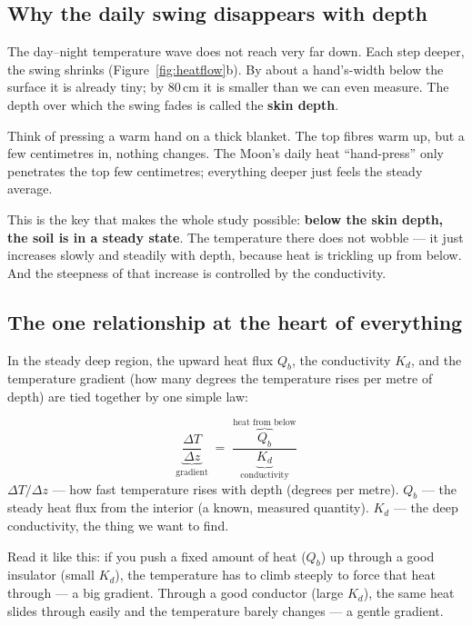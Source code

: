 \documentclass[11pt]{article}
\begin{document}
\subsection{Why the daily swing disappears with depth}

The day--night temperature wave does not reach very far down. Each step
deeper, the swing shrinks (Figure~\ref{fig:heatflow}b). By about a
hand's-width below the surface it is already tiny; by 80\,cm it is
smaller than we can even measure. The depth over which the swing fades is
called the \textbf{skin depth}.

\begin{plainbox}
Think of pressing a warm hand on a thick blanket. The top fibres warm
up, but a few centimetres in, nothing changes. The Moon's daily heat
``hand-press'' only penetrates the top few centimetres; everything
deeper just feels the steady average.
\end{plainbox}

This is the key that makes the whole study possible: \textbf{below the
skin depth, the soil is in a steady state}. The temperature there does
not wobble --- it just increases slowly and steadily with depth, because
heat is trickling up from below. And the steepness of that increase is
controlled by the conductivity.

\subsection{The one relationship at the heart of everything}

In the steady deep region, the upward heat flux $Q_b$, the conductivity
$K_d$, and the temperature gradient (how many degrees the temperature
rises per metre of depth) are tied together by one simple law:

\begin{mathbox}
\[
\underbrace{\frac{\Delta T}{\Delta z}}_{\text{gradient}}
\;=\;
\frac{\overbrace{Q_b}^{\text{heat from below}}}
     {\underbrace{K_d}_{\text{conductivity}}}
\]
\textbf{$\Delta T/\Delta z$} --- how fast temperature rises with depth
(degrees per metre). \textbf{$Q_b$} --- the steady heat flux from the
interior (a known, measured quantity). \textbf{$K_d$} --- the deep
conductivity, the thing we want to find.
\end{mathbox}

Read it like this: if you push a fixed amount of heat ($Q_b$) up through
a good insulator (small $K_d$), the temperature has to climb steeply to
force that heat through --- a big gradient. Through a good conductor
(large $K_d$), the same heat slides through easily and the temperature
barely changes --- a gentle gradient.
\end{document}
